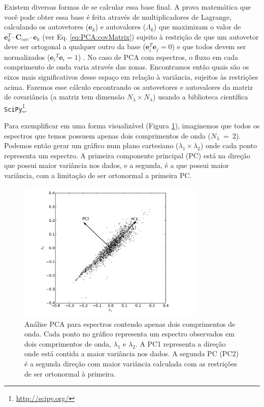 Existem diversas formas de se calcular essa base final. A prova matemática que você pode obter essa base é feita através
de multiplicadores de Lagrange, calculando os autovetores ($\mathbf{e}{}_k$) e autovalores ($\Lambda_k$) que maximizam o
valor de $\mathbf{e}{}_k^T \cdot \mathbf{C}{}_{cov} \cdot \mathbf{e}{}_k$ (ver Eq. \ref{eq:PCA:covMatrix}) sujeito à
restrição de que um autovetor deve ser ortogonal a qualquer outro da base ($\mathbf{e}{}_i^T \mathbf{e}{}_j = 0$) e que
todos devem ser normalizados ($\mathbf{e}{}_i{}^T \mathbf{e}{}_i = 1$) \citep[][p. 5-6]{JolliffePCA1986}. No caso de PCA
com espectros, o fluxo em cada comprimento de onda varia através das zonas. Encontramos então quais são os eixos mais
significativos desse espaço em relação à variância, sujeitos às restrições acima. Fazemos esse cálculo encontrando os
autovetores e autovalores da matriz de covariância (a matriz tem dimensão $N_\lambda \times N_\lambda$) usando a
biblioteca científica \texttt{SciPy}\footnote{\url{http://scipy.org/}}.

Para exemplificar em uma forma visualizável (Figura \ref{fig:PCA:exempl2D}), imaginemos que todos os espectros que temos
possuem apenas dois comprimentos de onda ($N_\lambda\ =\ 2$). Podemos então gerar um gráfico num plano cartesiano
($\lambda_1 \times \lambda_2$) onde cada ponto representa um espectro. A primeira componente principal (PC) está na
direção que possui maior variância nos dados, e a segunda, é a que possui maior variância, com a limitação de ser
ortonormal a primeira PC.

\begin{figure}
    \includegraphics[width=0.8\textwidth]{figuras/PCA2D.pdf}
    \caption[Exemplo de PCA com duas dimens\~{o}es.]
    {Análise PCA para espectros contendo apenas dois comprimentos de onda. Cada ponto no gráfico representa um espectro
    observados em dois comprimentos de onda, $\lambda_1$ e $\lambda_2$. A PC1 representa a direção onde está contida a
    maior variância nos dados. A segunda PC (PC2) é a segunda direção com maior variância calculada com as restrições de
    ser ortonormal à primeira.}
    \label{fig:PCA:exempl2D}
\end{figure}

